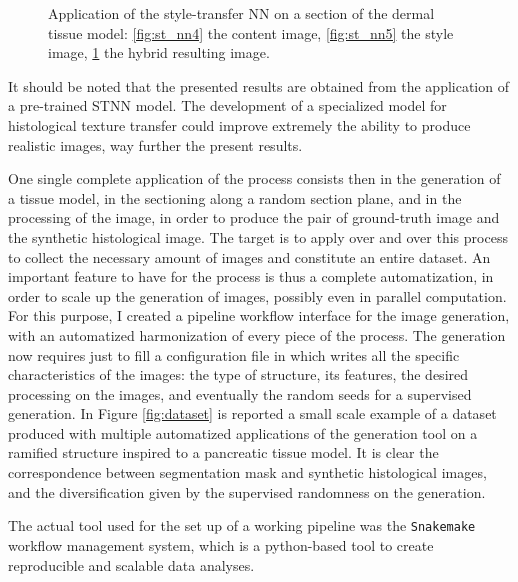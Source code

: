 \begin{description}
\begin{figure}
\begin{subfigure}[t]{0.3\textwidth}
                 \caption{}
                 \label{fig:st_nn6}
            \end{subfigure}
            \caption{Application of the style-transfer NN on a section of the dermal tissue model: \ref{fig:st_nn4} the content image, \ref{fig:st_nn5} the style image, \ref{fig:st_nn6} the hybrid resulting image.}
            \label{fig:derm_stnn}
        \end{figure}

        It should be noted that the presented results are obtained from the application of a pre-trained STNN model. The development of a specialized model for histological texture transfer could improve extremely the ability to produce realistic images, way further the present results.
    \end{description}

One single complete application of the process consists then in the generation of a tissue model, in the sectioning along a random section plane, and in the processing of the image, in order to produce the pair of ground-truth image and the synthetic histological image. The target is to apply over and over this process to collect the necessary amount of images and constitute an entire dataset. An important feature to have for the process is thus a complete automatization, in order to scale up the generation of images, possibly even in parallel computation.
For this purpose, I created a pipeline workflow interface for the image generation, with an automatized harmonization of every piece of the process. The generation now requires just to fill a configuration file in which writes all the specific characteristics of the images: the type of structure, its features, the desired processing on the images, and eventually the random seeds for a supervised generation. In Figure \ref{fig:dataset} is reported a small scale example of a dataset produced with multiple automatized applications of the generation tool on a ramified structure inspired to a pancreatic tissue model. It is clear the correspondence between segmentation mask and synthetic histological images, and the diversification given by the supervised randomness on the generation.

The actual tool used for the set up of a working pipeline was the \texttt{Snakemake} \cite{10.1093/bioinformatics/bts480} workflow management system, which is a python-based tool to create reproducible and scalable data analyses.

